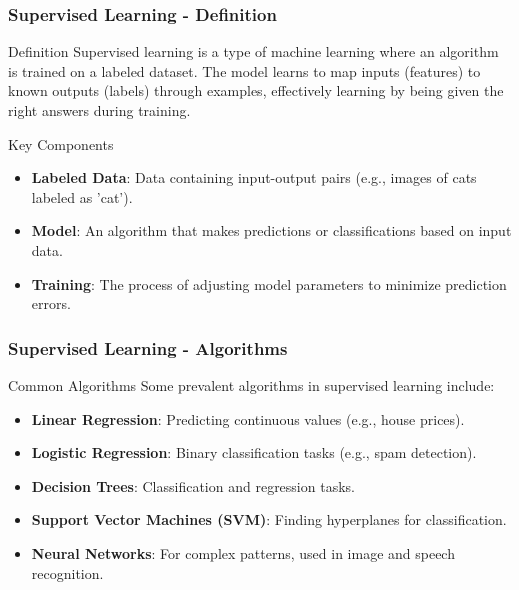 \documentclass[aspectratio=169]{beamer}
\begin{document}
\begin{frame}[fragile]
    \frametitle{Supervised Learning - Definition}
    \begin{block}{Definition}
        Supervised learning is a type of machine learning where an algorithm is trained on a labeled dataset. The model learns to map inputs (features) to known outputs (labels) through examples, effectively learning by being given the right answers during training.
    \end{block}
    
    \begin{block}{Key Components}
        \begin{itemize}
            \item \textbf{Labeled Data}: Data containing input-output pairs (e.g., images of cats labeled as 'cat').
            \item \textbf{Model}: An algorithm that makes predictions or classifications based on input data.
            \item \textbf{Training}: The process of adjusting model parameters to minimize prediction errors.
        \end{itemize}
    \end{block}
\end{frame}

\begin{frame}[fragile]
    \frametitle{Supervised Learning - Algorithms}
    \begin{block}{Common Algorithms}
        Some prevalent algorithms in supervised learning include:
        \begin{itemize}
            \item \textbf{Linear Regression}: Predicting continuous values (e.g., house prices).
            \item \textbf{Logistic Regression}: Binary classification tasks (e.g., spam detection).
            \item \textbf{Decision Trees}: Classification and regression tasks.
            \item \textbf{Support Vector Machines (SVM)}: Finding hyperplanes for classification.
            \item \textbf{Neural Networks}: For complex patterns, used in image and speech recognition.
        \end{itemize}
    \end{block}
\end{frame}
\end{document}
